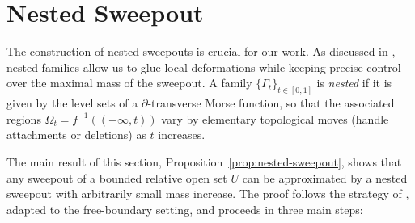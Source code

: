 \section{Nested Sweepout}\label{ch:nested-sweepout}

The construction of nested sweepouts is crucial for our work. As discussed in \cite[§6]{CL20}, nested families allow us to glue local deformations while keeping precise control over the maximal mass of the sweepout. A family $\{\Gamma_t\}_{t\in[0,1]}$ is \emph{nested} if it is given by the level sets of a $\partial$-transverse Morse function, so that the associated regions $\Omega_t = f^{-1}((-\infty,t))$ vary by elementary topological moves (handle attachments or deletions) as $t$ increases.

The main result of this section, Proposition~\ref{prop:nested-sweepout}, shows that any sweepout of a bounded relative open set $U$ can be approximated by a nested sweepout with arbitrarily small mass increase. The proof follows the strategy of \cite[Lemma~6.2]{CL20}, adapted to the free-boundary setting, and proceeds in three main steps:

